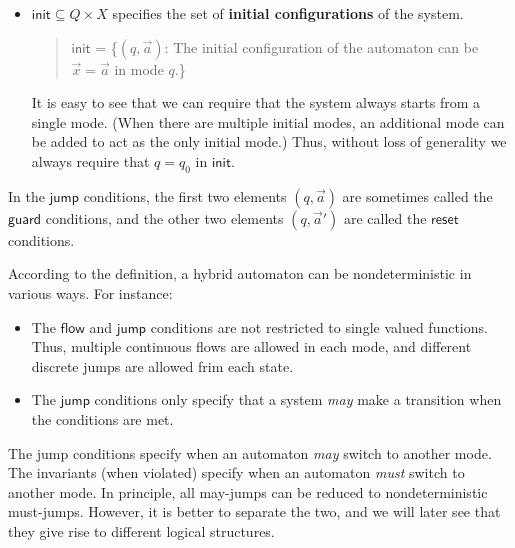 \documentclass[envcountsect]{llncs}
\newcommand{\flow}{\mathsf{flow}}
\newcommand{\jump}{\mathsf{jump}}
\newcommand{\inv}{\mathsf{inv}}
\newcommand{\init}{\mathsf{init}}
\newcommand{\guard}{\mathsf{guard}}
\newcommand{\reset}{\mathsf{reset}}
\begin{document}
\begin{definition}
\begin{itemize}
\item $\init \subseteq Q\times X$ specifies the set of {\bf initial configurations} of the system. 
\begin{quote}
$\init$ = \{$(q, \vec a)$: The initial configuration of the automaton can be $\vec x = \vec a$ in mode $q$.\}
\end{quote}
It is easy to see that we can require that the system always starts from a single mode. (When there are multiple initial modes, an additional mode can be added to act as the only initial mode.) Thus, without loss of generality we always require that $q=q_0$ in $\init$. 
\end{itemize}
\end{definition}


\begin{remark}[$\guard$ and $\reset$]
In the $\jump$ conditions, the first two elements $(q, \vec a)$ are sometimes called the $\guard$ conditions, and the other two elements $(q, \vec a')$ are called the $\reset$ conditions. 
\end{remark}

\begin{remark}[Nondeterminism]
According to the definition, a hybrid automaton can be nondeterministic in various ways. For instance: 
\begin{itemize}
\item The $\flow$ and $\jump$ conditions are not restricted to single valued functions. Thus, multiple continuous flows are allowed in each mode, and different discrete jumps are allowed frim each state. 
\item The $\jump$ conditions only specify that a system {\em may} make a transition when the conditions are met. 
\end{itemize}
\end{remark}

\begin{remark}[$\jump$ vs $\inv$] The jump conditions specify when an automaton {\em may} switch to another mode. The invariants (when violated) specify when an automaton {\em must} switch to another mode. In principle, all may-jumps can be reduced to nondeterministic must-jumps. However, it is better to separate the two, and we will later see that they give rise to different logical structures. 
\end{remark}
\end{document}
